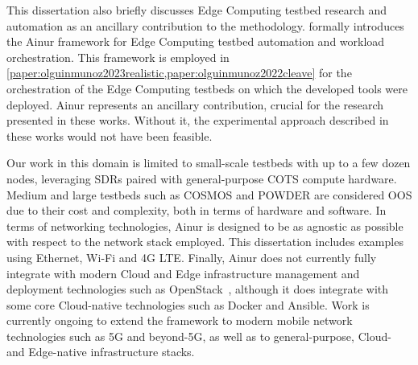 \bigskip

This dissertation also briefly discusses Edge Computing testbed research and automation as an ancillary contribution to the methodology.
 formally introduces the Ainur framework for Edge Computing testbed automation and workload orchestration.
This framework is employed in \cref{paper:olguinmunoz2023realistic,paper:olguinmunoz2022cleave} for the orchestration of the Edge Computing testbeds on which the developed tools were deployed.
Ainur represents an ancillary contribution, crucial for the research presented in these works.
Without it, the experimental approach described in these works would not have been feasible.

Our work in this domain is limited to small-scale testbeds with up to a few dozen nodes, leveraging \glspl{SDR} paired with general-purpose \gls{COTS} compute hardware.
Medium and large testbeds such as \gls{COSMOS} and \gls{POWDER} are considered \gls{OOS} due to their cost and complexity, both in terms of hardware and software.
In terms of networking technologies, Ainur is designed to be as agnostic as possible with respect to the network stack employed.
This dissertation includes examples using Ethernet, Wi-Fi and 4G \gls{LTE}.
Finally, Ainur does not currently fully integrate with modern Cloud and Edge infrastructure management and deployment technologies such as OpenStack~\cite{openstack}, although it does integrate with some core Cloud-native technologies such as Docker and Ansible.
Work is currently ongoing to extend the framework to modern mobile network technologies such as 5G and beyond-5G, as well as to general-purpose, Cloud- and Edge-native infrastructure stacks.